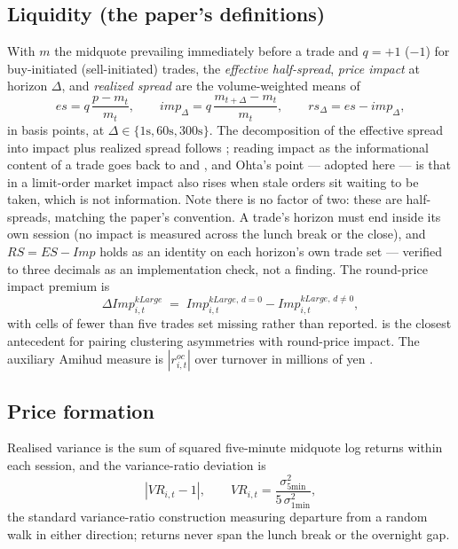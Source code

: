 \subsection{Liquidity (the paper's definitions)}

With $m$ the midquote prevailing immediately before a trade and $q=+1$
($-1$) for buy-initiated (sell-initiated) trades, the \emph{effective
half-spread}, \emph{price impact} at horizon $\Delta$, and \emph{realized
spread} are the volume-weighted means of
%
\begin{equation}
\mathit{es} = q\,\frac{p - m_t}{m_t}, \qquad
\mathit{imp}_\Delta = q\,\frac{m_{t+\Delta} - m_t}{m_t}, \qquad
\mathit{rs}_\Delta = \mathit{es} - \mathit{imp}_\Delta,
\label{eq:spread}
\end{equation}
%
in basis points, at $\Delta \in \{1\mathrm{s}, 60\mathrm{s}, 300\mathrm{s}\}$.
The decomposition of the effective spread into impact plus realized spread
follows \textcite{HendershottJonesMenkveld2011}; reading impact as the
informational content of a trade goes back to \textcite{GlostenMilgrom1985}
and \textcite{Hasbrouck1991}, and Ohta's point --- adopted here --- is that in
a limit-order market impact also rises when stale orders sit waiting to be
taken, which is not information. Note there is no factor of two: these are
half-spreads, matching the paper's convention. A trade's horizon must end
inside its own session (no impact is measured across the lunch break or the
close), and $\mathit{RS} = \mathit{ES} - \mathit{Imp}$ holds as an identity on
each horizon's own trade set --- verified to three decimals as an
implementation check, not a finding. The round-price impact premium is
%
\begin{equation}
\Delta\mathit{Imp}^{k\mathit{Large}}_{i,t} \;=\;
\mathit{Imp}^{k\mathit{Large},\,d=0}_{i,t} -
\mathit{Imp}^{k\mathit{Large},\,d\neq 0}_{i,t},
\label{eq:dimp}
\end{equation}
%
with cells of fewer than five trades set missing rather than reported.
\textcite{BoxGriffith2016} is the closest antecedent for pairing clustering
asymmetries with round-price impact. The auxiliary Amihud measure is
$|r^{oc}_{i,t}|$ over turnover in millions of yen \parencite{Amihud2002}.

\subsection{Price formation}

Realised variance is the sum of squared five-minute midquote log returns
within each session, and the variance-ratio deviation is
%
\begin{equation}
\left| \mathit{VR}_{i,t} - 1 \right|, \qquad
\mathit{VR}_{i,t} = \frac{\sigma^2_{5\mathrm{min}}}{5\,\sigma^2_{1\mathrm{min}}},
\label{eq:vr}
\end{equation}
%
the standard variance-ratio construction measuring departure from a random
walk in either direction; returns never span the lunch break or the overnight
gap.

